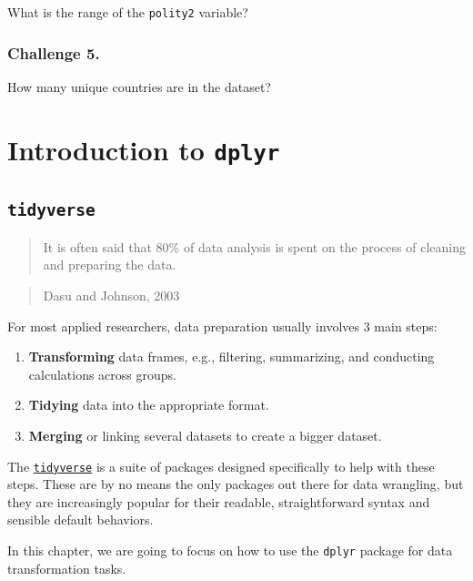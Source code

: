 \documentclass[]{book}
\providecommand{\tightlist}{%
  \setlength{\itemsep}{0pt}\setlength{\parskip}{0pt}}
\begin{document}
What is the range of the \texttt{polity2} variable?

\subsubsection*{Challenge 5.}\label{challenge-5.}

How many unique countries are in the dataset?

\section{\texorpdfstring{Introduction to
\texttt{dplyr}}{Introduction to dplyr}}\label{introduction-to-dplyr}

\subsection{\texorpdfstring{\texttt{tidyverse}}{tidyverse}}\label{tidyverse}

\begin{quote}
It is often said that 80\% of data analysis is spent on the process of
cleaning and preparing the data.
\end{quote}

\begin{quote}
Dasu and Johnson, 2003
\end{quote}

For most applied researchers, data preparation usually involves 3 main
steps:

\begin{enumerate}
\def\labelenumi{\arabic{enumi}.}
\tightlist
\item
  \textbf{Transforming} data frames, e.g., filtering, summarizing, and
  conducting calculations across groups.
\item
  \textbf{Tidying} data into the appropriate format.
\item
  \textbf{Merging} or linking several datasets to create a bigger
  dataset.
\end{enumerate}

The \href{https://www.tidyverse.org/}{\texttt{tidyverse}} is a suite of
packages designed specifically to help with these steps. These are by no
means the only packages out there for data wrangling, but they are
increasingly popular for their readable, straightforward syntax and
sensible default behaviors.

In this chapter, we are going to focus on how to use the \texttt{dplyr}
package for data transformation tasks.
\end{document}
